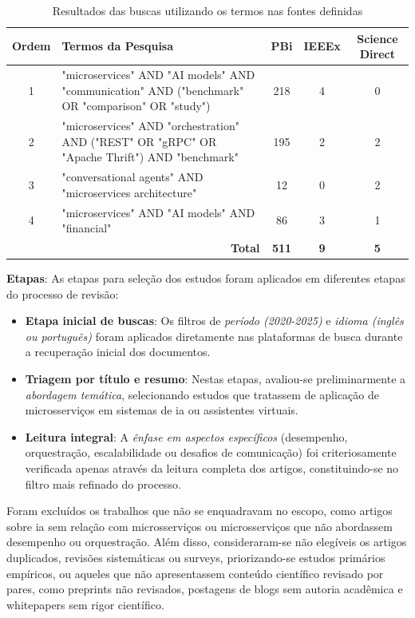 \begin{table}[H]
\centering
\caption{Resultados das buscas utilizando os termos nas fontes definidas}
\begin{tabularx}{\textwidth}{|c|X|c|c|c|}
\hline
\textbf{Ordem} & \textbf{Termos da Pesquisa} & \textbf{PBi} & \textbf{IEEEx} & \textbf{Science Direct} \\
\hline
1 & "microservices" AND "AI models" AND "communication" AND ("benchmark" OR "comparison" OR "study") & 218 & 4 & 0 \\
\hline
2 & "microservices" AND "orchestration" AND ("REST" OR "gRPC" OR "Apache Thrift") AND "benchmark" & 195 & 2 & 2 \\
\hline
3 & "conversational agents" AND "microservices architecture" & 12 & 0 & 2 \\
\hline
4 & "microservices" AND "AI models" AND "financial" & 86 & 3 & 1 \\
\hline
\multicolumn{2}{|r|}{\textbf{Total}} & \textbf{511} & \textbf{9} & \textbf{5} \\
\hline
\end{tabularx}
\label{tab:3-total-rsl}
\end{table}

\textbf{Etapas}: As etapas para seleção dos estudos foram aplicados em diferentes etapas do processo de revisão:
\begin{itemize}
\item \textbf{Etapa inicial de buscas}: Os filtros de \textit{período (2020-2025)} e \textit{idioma (inglês ou português)} foram aplicados diretamente nas plataformas de busca durante a recuperação inicial dos documentos.

\item \textbf{Triagem por título e resumo}: Nestas etapas, avaliou-se preliminarmente a \textit{abordagem temática}, selecionando estudos que tratassem de aplicação de microsserviços em sistemas de \gls{ia} ou assistentes virtuais.

\item \textbf{Leitura integral}: A \textit{ênfase em aspectos específicos} (desempenho, orquestração, escalabilidade ou desafios de comunicação) foi criteriosamente verificada apenas através da leitura completa dos artigos, constituindo-se no filtro mais refinado do processo.
\end{itemize}

Foram excluídos os trabalhos que não se enquadravam no escopo, como artigos sobre \acrfull{ia} sem relação com microsserviços ou microsserviços que não abordassem desempenho ou orquestração. Além disso, consideraram-se não elegíveis os artigos duplicados, revisões sistemáticas ou surveys, priorizando-se estudos primários empíricos, ou aqueles que não apresentassem conteúdo científico revisado por pares, como preprints não revisados, postagens de blogs sem autoria acadêmica e whitepapers sem rigor científico.

